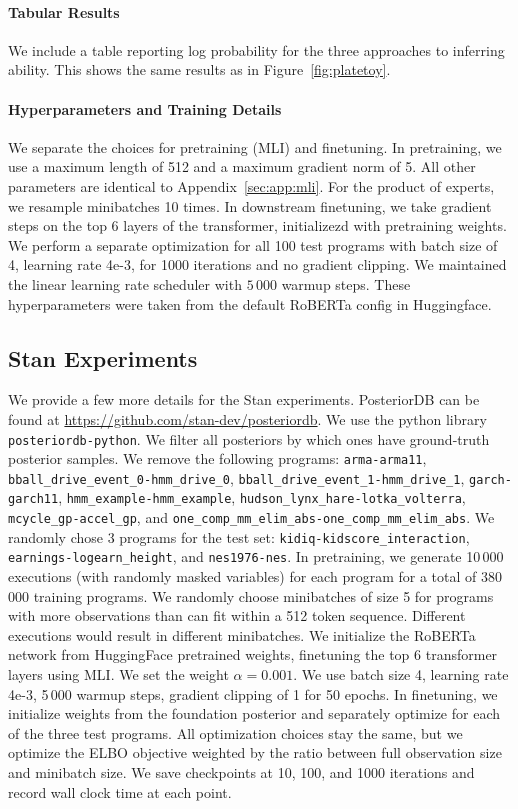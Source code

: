\paragraph{Tabular Results} We include a table reporting log probability for the three approaches to inferring ability. This shows the same results as in Figure~\ref{fig:platetoy}.

\paragraph{Hyperparameters and Training Details} We separate the choices for pretraining (MLI) and finetuning. In pretraining, we use a maximum length of 512 and a maximum gradient norm of 5. All other parameters are identical to Appendix~\ref{sec:app:mli}. For the product of experts, we resample minibatches 10 times. In downstream finetuning, we take gradient steps on the top 6 layers of the transformer, initializezd with pretraining weights. We perform a separate optimization for all 100 test programs with batch size of 4, learning rate 4e-3, for 1000 iterations and no gradient clipping. We maintained the linear learning rate scheduler with $5\,000$ warmup steps. These hyperparameters were taken from the default RoBERTa config in Huggingface.

\subsection{Stan Experiments}

We provide a few more details for the Stan experiments. PosteriorDB can be found at \url{https://github.com/stan-dev/posteriordb}. We use the python library \texttt{posteriordb-python}. We filter all posteriors by which ones have ground-truth posterior samples. We remove the following programs: \texttt{arma-arma11}, \texttt{bball\_drive\_event\_0-hmm\_drive\_0}, \texttt{bball\_drive\_event\_1-hmm\_drive\_1}, \texttt{garch-garch11}, \texttt{hmm\_example-hmm\_example}, \texttt{hudson\_lynx\_hare-lotka\_volterra}, \texttt{mcycle\_gp-accel\_gp}, and \newline \texttt{one\_comp\_mm\_elim\_abs-one\_comp\_mm\_elim\_abs}. We randomly chose 3 programs for the test set: \texttt{kidiq-kidscore\_interaction}, \texttt{earnings-logearn\_height}, and \texttt{nes1976-nes}. In pretraining, we generate 10\,000 executions (with randomly masked variables) for each program for a total of 380\,000 training programs. We randomly choose minibatches of size 5 for programs with more observations than can fit within a 512 token sequence. Different executions would result in different minibatches. We initialize the RoBERTa network from HuggingFace pretrained weights, finetuning the top 6 transformer layers using MLI. We set the weight $\alpha = 0.001$. We use batch size 4, learning rate 4e-3, 5\,000 warmup steps, gradient clipping of 1 for 50 epochs. In finetuning, we initialize weights from the foundation posterior and separately optimize for each of the three test programs. All optimization choices stay the same, but we optimize the ELBO objective weighted by the ratio between full observation size and minibatch size. We save checkpoints at 10, 100, and 1000 iterations and record wall clock time at each point.

